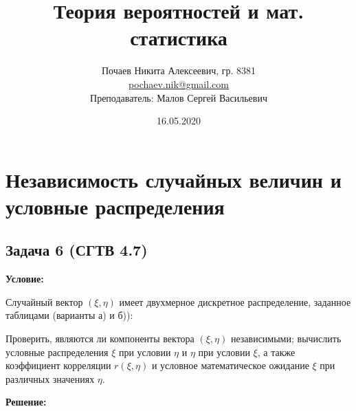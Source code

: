 

\title{Теория вероятностей и мат. статистика}
\date{16.05.2020}
\author{Почаев Никита Алексеевич, гр. 8381 \\ \href{mailto:pochaev.nik@gmail.com}{pochaev.nik@gmail.com} \\ Преподаватель: Малов Сергей Васильевич}


	
\renewcommand{\figurename}{Рисунок}

\maketitle

\section*{Независимость случайных величин и условные распределения}

\subsection*{Задача 6 (СГТВ 4.7)}

\noindent\textbf{Условие:}

Случайный вектор $(\xi, \eta)$ имеет двухмерное дискретное распределение, заданное таблицами (варианты а) и б)):
\begin{figure}[h]
\end{figure}

Проверить, являются ли компоненты вектора $(\xi, \eta)$ независимыми; вычислить условные распределения $\xi$ при условии $\eta$ и $\eta$ при условии $\xi$, а также коэффициент корреляции $r(\xi, \eta)$ и условное математическое ожидание $\xi$ при различных значениях $\eta$.

\noindent\textbf{Решение:}

